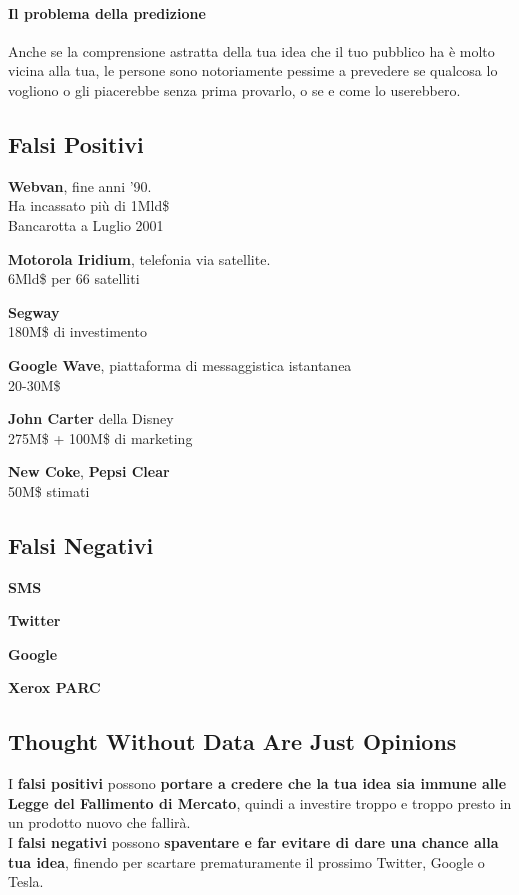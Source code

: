 \documentclass[10pt]{article}
\begin{document}
\paragraph{Il problema della predizione} Anche se la comprensione astratta della tua idea che il tuo pubblico ha è molto vicina alla tua, le persone sono notoriamente pessime a prevedere se qualcosa lo vogliono o gli piacerebbe senza prima provarlo, o se e come lo userebbero.
\begin{multicols}{2}
\subsection{Falsi Positivi}
\begin{list}{}{}
\item \textbf{Webvan}, fine anni '90.\\Ha incassato più di 1Mld\$\\Bancarotta a Luglio 2001
\item \textbf{Motorola Iridium}, telefonia via satellite.\\6Mld\$ per 66 satelliti
\item \textbf{Segway}\\180M\$ di investimento
\item \textbf{Google Wave}, piattaforma di messaggistica istantanea\\20-30M\$
\item \textbf{John Carter} della Disney\\275M\$ + 100M\$ di marketing
\item \textbf{New Coke}, \textbf{Pepsi Clear}\\50M\$ stimati
\end{list}
\columnbreak
\subsection{Falsi Negativi}
\begin{list}{}{}
\item \textbf{SMS}
\item \textbf{Twitter}
\item \textbf{Google}
\item \textbf{Xerox PARC}
\end{list}
\end{multicols}
\subsection{Thought Without Data Are Just Opinions}
I \textbf{falsi positivi} possono \textbf{portare a credere che la tua idea sia immune alle Legge del Fallimento di Mercato}, quindi a investire troppo e troppo presto in un prodotto nuovo che fallirà.\\
I \textbf{falsi negativi} possono \textbf{spaventare e far evitare di dare una chance alla tua idea}, finendo per scartare prematuramente il prossimo Twitter, Google o Tesla.
\end{document}
